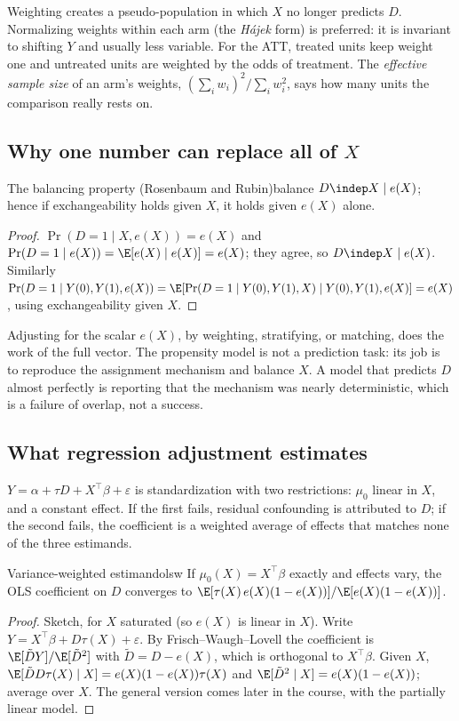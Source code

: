 \documentclass[11pt]{article}
\begin{document}
Weighting creates a pseudo-population in which $X$ no longer predicts $D$. Normalizing weights within each arm (the
\emph{H\'ajek} form) is preferred: it is invariant to shifting $Y$ and usually less variable. For the ATT, treated units keep
weight one and untreated units are weighted by the odds of treatment. The \emph{effective sample size} of an arm's weights,
$(\sum_i w_i)^2/\sum_i w_i^2$, says how many units the comparison really rests on.

\subsection{Why one number can replace all of \texorpdfstring{$X$}{X}}

\begin{prop}{The balancing property (Rosenbaum and Rubin)}{balance}
$D \indep X \mid e(X)$; hence if exchangeability holds given $X$, it holds given $e(X)$ alone.
\end{prop}
\begin{proof}
$\Pr(D=1 \mid X, e(X)) = e(X)$ and $\Pr(D=1 \mid e(X)) = \E[e(X) \mid e(X)] = e(X)$; they agree, so $D \indep X \mid e(X)$. Similarly
$\Pr(D=1 \mid Y(0), Y(1), e(X)) = \E[\Pr(D=1 \mid Y(0), Y(1), X) \mid Y(0), Y(1), e(X)] = e(X)$, using exchangeability given $X$.
\end{proof}

Adjusting for the scalar $e(X)$, by weighting, stratifying, or matching, does the work of the full vector. The propensity model
is not a prediction task: its job is to reproduce the assignment mechanism and balance $X$. A model that predicts $D$ almost
perfectly is reporting that the mechanism was nearly deterministic, which is a failure of overlap, not a success.

\subsection{What regression adjustment estimates}

$Y = \alpha + \tau D + X^\top\beta + \varepsilon$ is standardization with two restrictions: $\mu_0$ linear in $X$, and a constant
effect. If the first fails, residual confounding is attributed to $D$; if the second fails, the coefficient is a weighted
average of effects that matches none of the three estimands.

\begin{prop}{Variance-weighted estimand}{olsw}
If $\mu_0(X) = X^\top\beta$ exactly and effects vary, the OLS coefficient on $D$ converges to
$\E[\tau(X)\,e(X)(1-e(X))]/\E[e(X)(1-e(X))]$.
\end{prop}
\begin{proof}
Sketch, for $X$ saturated (so $e(X)$ is linear in $X$). Write $Y = X^\top\beta + D\tau(X) + \varepsilon$. By
Frisch--Waugh--Lovell the coefficient is $\E[\tilde D Y]/\E[\tilde D^2]$ with $\tilde D = D - e(X)$, which is orthogonal to $X^\top\beta$.
Given $X$, $\E[\tilde D D\tau(X) \mid X] = e(X)(1-e(X))\tau(X)$ and $\E[\tilde D^2 \mid X] = e(X)(1-e(X))$; average over $X$. The general version
comes later in the course, with the partially linear model.
\end{proof}
\end{document}
